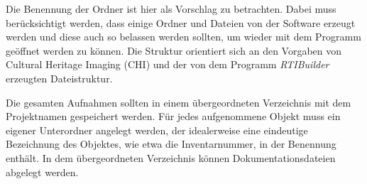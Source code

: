 Die Benennung der Ordner ist hier als Vorschlag zu betrachten. Dabei muss berücksichtigt werden, dass einige Ordner und Dateien von der Software erzeugt werden und diese auch so belassen werden sollten, um wieder mit dem Programm geöffnet werden zu können. Die Struktur orientiert sich an den Vorgaben von Cultural Heritage Imaging (CHI) und der von dem Programm \emph{RTIBuilder} erzeugten Dateistruktur.

Die gesamten Aufnahmen sollten in einem übergeordneten Verzeichnis mit dem Projektnamen gespeichert werden. Für jedes aufgenommene Objekt muss ein eigener Unterordner angelegt werden, der idealerweise eine eindeutige Bezeichnung des Objektes, wie etwa die Inventarnummer, in der Benennung enthält. In dem übergeordneten Verzeichnis können Dokumentationsdateien abgelegt werden.

